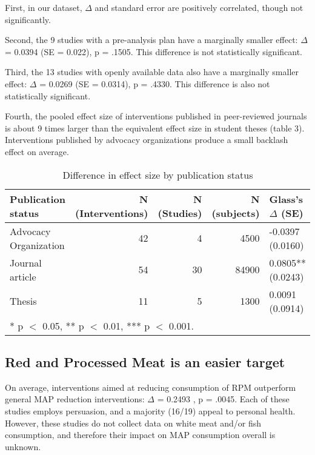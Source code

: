 \documentclass[sn-nature,pdflatex]{sn-jnl}
\begin{document}
First, in our dataset, \(\Delta\) and standard error are positively
correlated, though not significantly.

\begin{comment} 
good place for a figure?
\end{comment}

Second, the 9 studies with a pre-analysis plan have a marginally smaller
effect: \(\Delta\) = 0.0394 (SE = 0.022), p = .1505. This difference is
not statistically significant.

Third, the 13 studies with openly available data also have a marginally
smaller effect: \(\Delta\) = 0.0269 (SE = 0.0314), p = .4330. This
difference is also not statistically significant.

Fourth, the pooled effect size of interventions published in
peer-reviewed journals is about 9 times larger than the equivalent
effect size in student theses (table 3). Interventions published by
advocacy organizations produce a small backlash effect on average.

\begin{table}[!h]
\centering
\caption{\label{tab:tab:table_three}Difference in effect size by publication status}
\centering
\begin{tabular}[t]{lrrrl}
\toprule
Publication status & N (Interventions) & N (Studies) & N (subjects) & Glass's $\Delta$ (SE)\\
\midrule
Advocacy Organization & 42 & 4 & 4500 & -0.0397 (0.0160)\\
Journal article & 54 & 30 & 84900 & 0.0805** (0.0243)\\
Thesis & 11 & 5 & 1300 & 0.0091 (0.0914)\\
\bottomrule
\multicolumn{5}{l}{\rule{0pt}{1em}* p $<$ 0.05, ** p $<$ 0.01, *** p $<$ 0.001.}\\
\end{tabular}
\end{table}

\subsection{Red and Processed Meat is an easier target}\label{sec2.4}

On average, interventions aimed at reducing consumption of RPM
outperform general MAP reduction interventions: \(\Delta\) = 0.2493
, p = .0045. Each of these studies employs
persuasion, and a majority (16/19) appeal to personal health. However,
these studies do not collect data on white meat and/or fish consumption,
and therefore their impact on MAP consumption overall is unknown.
\end{document}
